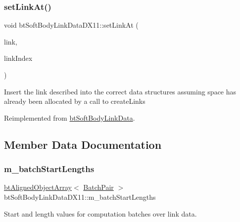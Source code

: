 \subsubsection{\texorpdfstring{set\+Link\+At()}{setLinkAt()}\hspace{0.1cm}{\footnotesize\ttfamily [2/2]}}
{\footnotesize\ttfamily void bt\+Soft\+Body\+Link\+Data\+D\+X11\+::set\+Link\+At (\begin{DoxyParamCaption}\item[{const \hyperlink{classbtSoftBodyLinkData_1_1LinkDescription}{Link\+Description} \&}]{link,  }\item[{int}]{link\+Index }\end{DoxyParamCaption})\hspace{0.3cm}{\ttfamily [virtual]}}

Insert the link described into the correct data structures assuming space has already been allocated by a call to create\+Links 

Reimplemented from \hyperlink{classbtSoftBodyLinkData_a44f200dcb878405cebf3704dc7a8b8cd}{bt\+Soft\+Body\+Link\+Data}.



\subsection{Member Data Documentation}
\mbox{\label{classbtSoftBodyLinkDataDX11_af39feddd5c9c8beb3003fb07df835705}} 
\subsubsection{\texorpdfstring{m\+\_\+batch\+Start\+Lengths}{m\_batchStartLengths}}
{\footnotesize\ttfamily \hyperlink{classbtAlignedObjectArray}{bt\+Aligned\+Object\+Array}$<$ \hyperlink{structbtSoftBodyLinkDataDX11_1_1BatchPair}{Batch\+Pair} $>$ bt\+Soft\+Body\+Link\+Data\+D\+X11\+::m\+\_\+batch\+Start\+Lengths}

Start and length values for computation batches over link data. \mbox{\label{classbtSoftBodyLinkDataDX11_a712400cc15cbe3fd96d93cfa135f53ef}} 

